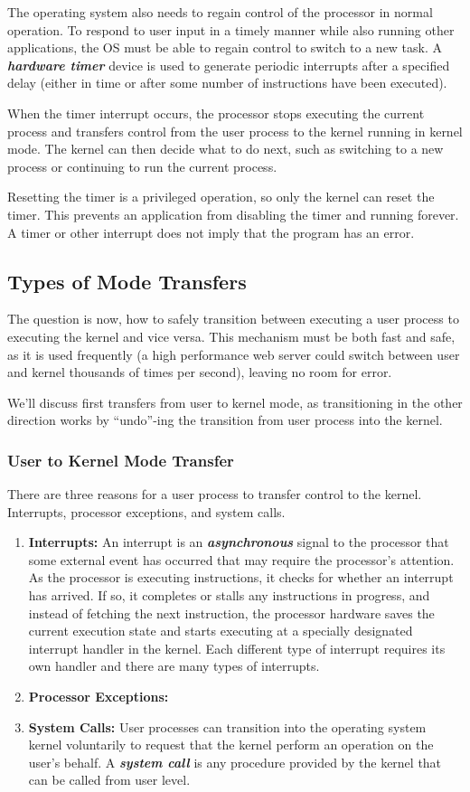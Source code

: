 \documentclass{article}
\begin{document}
The operating system also needs to regain control of the processor in normal operation. To respond to user input in a timely manner while also running other applications, the OS must be able to regain control to switch to a new task. A \textbf{\textit{hardware timer}} device is used to generate periodic interrupts after a specified delay (either in time or after some number of instructions have been executed).

When the timer interrupt occurs, the processor stops executing the current process and transfers control from the user process to the kernel running in kernel mode. The kernel can then decide what to do next, such as switching to a new process or continuing to run the current process.

Resetting the timer is a privileged operation, so only the kernel can reset the timer. This prevents an application from disabling the timer and running forever. A timer or other interrupt does not imply that the program has an error.

\subsection{Types of Mode Transfers}
The question is now, how to safely transition between executing a user process to executing the kernel and vice versa. This mechanism must be both fast and safe, as it is used frequently (a high performance web server could switch between user and kernel thousands of times per second), leaving no room for error.

We'll discuss first transfers from user to kernel mode, as transitioning in the other direction works by ``undo''-ing the transition from user process into the kernel.
\subsubsection{User to Kernel Mode Transfer}

There are three reasons for a user process to transfer control to the kernel. Interrupts, processor exceptions, and system calls.
\begin{enumerate}
    \item \textbf{Interrupts:} An interrupt is an \textit{\textbf{asynchronous}} signal to the processor that some external event has occurred that may require the processor's attention. As the processor is executing instructions, it checks for whether an interrupt has arrived. If so, it completes or stalls any instructions in progress, and instead of fetching the next instruction, the processor hardware saves the current execution state and starts executing at a specially designated interrupt handler in the kernel. Each different type of interrupt requires its own handler and  there are many types of interrupts.
    \item \textbf{Processor Exceptions:}
    \item \textbf{System Calls:} User processes can transition into the operating system kernel voluntarily to request that the kernel perform an operation on the user's behalf. A \textbf{\textit{system call}} is any procedure provided by the kernel that can be called from user level.
\end{enumerate}
\end{document}
